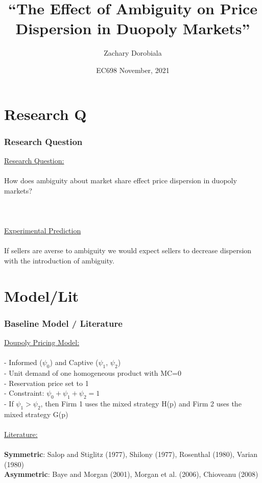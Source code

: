 \documentclass[red]{beamer}
\title{“The Effect of Ambiguity on Price Dispersion in Duopoly Markets”}
\author{Zachary Dorobiala }
\institute{University of Alabama}
\date{EC698 November, 2021}
\begin{document}
\begin{frame}
\titlepage
\end{frame}





\section{Research Q}
\begin{frame} [t]
\frametitle{Research Question}
\underline{Research Question:} \\~\\
\hspace*{20pt} How does ambiguity about market share effect price dispersion in duopoly markets? \\~\\ \\~\\
\underline{Experimental Prediction} \\~\\
\hspace*{20pt} If sellers are averse to ambiguity we would expect sellers to decrease dispersion with the introduction of ambiguity.
\end{frame}




\section{Model/Lit}
\begin{frame} [t]
\frametitle{Baseline Model / Literature}
\underline{Doupoly Pricing Model:} \\~\\
- Informed ($\psi_0$) and Captive ($\psi_1$, $\psi_2$) \\
- Unit demand of one homogeneous product with MC=0\\
- Reservation price set to 1 \\
- Constraint: $\psi_0 + \psi_1 + \psi_2 = 1$ \\
- If $\psi_1 > \psi_2$, then Firm 1 uses the mixed strategy H(p) and Firm 2 uses the mixed strategy G(p) \\~\\

\underline{Literature:} \\~\\
\textbf{Symmetric}: Salop and Stiglitz (1977), Shilony (1977), Rosenthal (1980), Varian (1980)\\
\textbf{Asymmetric}: Baye and Morgan (2001), Morgan et al. (2006), Chioveanu (2008)\\
\end{frame}
\end{document}
